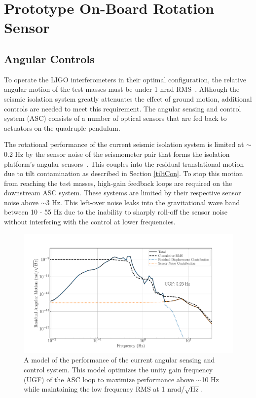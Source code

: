 \documentclass [12pt, proquest]{uwthesis}[2019]
\begin{document}
\chapter{Prototype On-Board Rotation Sensor}\label{cBRS_chap}
\section{Angular Controls}\label{ASC}

To operate the LIGO interferometers in their optimal configuration, the relative angular motion of the test masses must be under 1 nrad RMS~\cite{ASC}. Although the seismic isolation system greatly attenuates the effect of ground motion, additional controls are needed to meet this requirement. The angular sensing and control system (ASC) consists of a number of optical sensors that are fed back to actuators on the quadruple pendulum.~\cite{ASC}

The rotational performance of the current seismic isolation system is limited at $\sim$0.2 Hz by the sensor noise of the seismometer pair that forms the isolation platform's angular sensors~\cite{windproofing}. This couples into the residual translational motion due to tilt contamination as described in Section \ref{tiltCon}. To stop this motion from reaching the test masses, high-gain feedback loops are required on the downstream ASC system. These systems are limited by their respective sensor noise above $\sim$3 Hz. This left-over noise leaks into the gravitational wave band between 10 - 55 Hz due to the inability to sharply roll-off the sensor noise without interfering with the control at lower frequencies. 

\begin{figure}[!h]
\begin{center}
\includegraphics[width=\textwidth]{cBRS_ASC_Without.pdf}
\caption[Model of the performance of the current angular sensing and control system]{A model of the performance of the current angular sensing and control system. This model optimizes the unity gain frequency (UGF) of the ASC loop to maximize performance above $\sim$10 Hz while maintaining the low frequency RMS at 1 nrad/$\sqrt{\text{Hz}}$.}
\label{ascWithout}
\end{center}
\end{figure}
\end{document}
